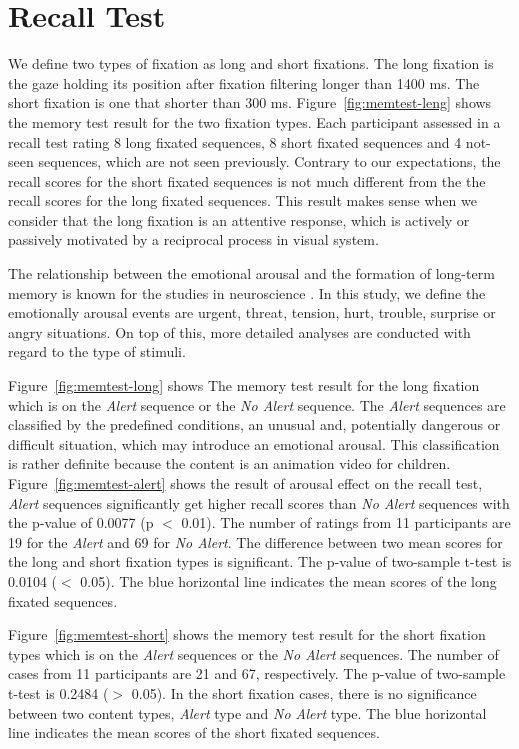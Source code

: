 \documentclass[oneside,master]{snueethesis}
\begin{document}
\section{Recall Test}

We define two types of fixation as long and short fixations. The long fixation is the gaze holding its position after fixation filtering longer than 1400 ms. The short fixation is one that shorter than 300 ms. Figure~\ref{fig:memtest-leng} shows the memory test result for the two fixation types. Each participant assessed in a recall test rating 8 long fixated sequences, 8 short fixated sequences and 4 not-seen sequences, which are not seen previously. Contrary to our expectations, the recall scores for the short fixated sequences is not much different from the the recall scores for the long fixated sequences. This result makes sense when we consider that the long fixation is an attentive response, which is actively or passively motivated by a reciprocal process in visual system.

The relationship between the emotional arousal and the formation of long-term memory is known for the studies in neuroscience \cite{Cahill1996amyg,Cahill1998baso}. In this study, we define the emotionally arousal events are urgent, threat, tension, hurt, trouble, surprise or angry situations. On top of this, more detailed analyses are conducted with regard to the type of stimuli.

Figure~\ref{fig:memtest-long} shows The memory test result for the long fixation which is on the \textit{Alert} sequence or the \textit{No Alert} sequence. The \textit{Alert} sequences are classified by the predefined conditions, an unusual and, potentially dangerous or difficult situation, which may introduce an emotional arousal. This classification is rather definite because the content is an animation video for children. Figure~\ref{fig:memtest-alert} shows the result of arousal effect on the recall test, \textit{Alert} sequences significantly get higher recall scores than \textit{No Alert} sequences with the p-value of 0.0077 (p $<$ 0.01). The number of ratings from 11 participants are 19 for the \textit{Alert} and 69 for \textit{No Alert}. The difference between two mean scores for the long and short fixation types is significant. The p-value of two-sample t-test is 0.0104 ($<$ 0.05). The blue horizontal line indicates the mean scores of the long fixated sequences.

Figure~\ref{fig:memtest-short} shows the memory test result for the short fixation types which is on the \textit{Alert} sequences or the \textit{No Alert} sequences. The number of cases from 11 participants are 21 and 67, respectively. The p-value of two-sample t-test is 0.2484 ($>$ 0.05). In the short fixation cases, there is no significance between two content types, \textit{Alert} type and \textit{No Alert} type. The blue horizontal line indicates the mean scores of the short fixated sequences.
\end{document}
